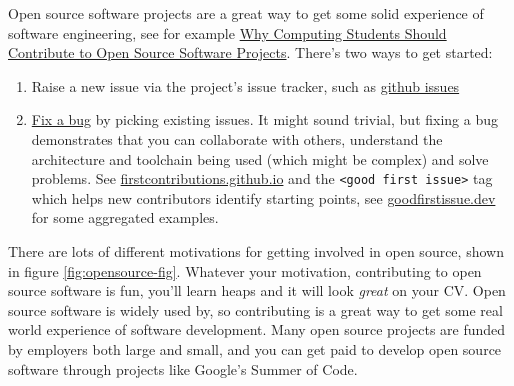 \documentclass[
]{book}
\providecommand{\tightlist}{%
  \setlength{\itemsep}{0pt}\setlength{\parskip}{0pt}}
\begin{document}
Open source software projects are a great way to get some solid experience of software engineering, see for example \href{https://cacm.acm.org/magazines/2021/7/253459-why-computing-students-should-contribute-to-open-source-software-projects/fulltext}{Why Computing Students Should Contribute to Open Source Software Projects}. \citep{Spinellis} There's two ways to get started:

\begin{enumerate}
\def\labelenumi{\arabic{enumi}.}
\tightlist
\item
  Raise a new issue via the project's issue tracker, such as \href{https://guides.github.com/features/issues/}{github issues} \citep{githubissues}
\item
  \href{https://dev.to/rose/fixing-a-bug-on-my-open-source-project-from-start-to-finish-1749}{Fix a bug} by picking existing issues. \citep{fixabug} It might sound trivial, but fixing a bug demonstrates that you can collaborate with others, understand the architecture and toolchain being used (which might be complex) and solve problems. See \href{https://firstcontributions.github.io/}{firstcontributions.github.io} and the \texttt{\textless{}good\ first\ issue\textgreater{}} tag which helps new contributors identify starting points, see \href{https://goodfirstissue.dev/}{goodfirstissue.dev} for some aggregated examples.
\end{enumerate}

There are lots of different motivations for getting involved in open source, shown in figure \ref{fig:opensource-fig}. Whatever your motivation, contributing to open source software is fun, you'll learn heaps and it will look \emph{great} on your CV. Open source software is widely used by, so contributing is a great way to get some real world experience of software development. Many open source projects are funded by employers both large and small, and you can get paid to develop open source software through projects like Google's Summer of Code. \citep{gsoc}
\end{document}
